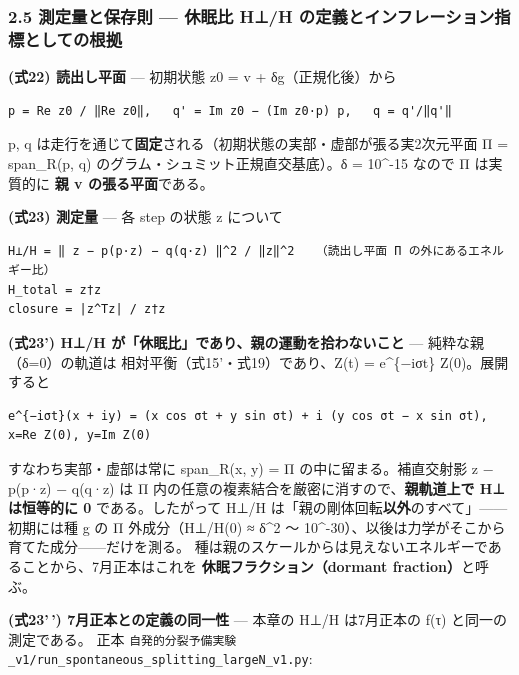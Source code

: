 \documentclass[
  a4paper,
]{ltjsarticle}
\begin{document}
\subsubsection{2.5 測定量と保存則 --- 休眠比 H⊥/H
の定義とインフレーション指標としての根拠}\label{ux6e2cux5b9aux91cfux3068ux4fddux5b58ux5247-ux4f11ux7720ux6bd4-hh-ux306eux5b9aux7fa9ux3068ux30a4ux30f3ux30d5ux30ecux30fcux30b7ux30e7ux30f3ux6307ux6a19ux3068ux3057ux3066ux306eux6839ux62e0}

\textbf{(式22) 読出し平面} --- 初期状態 z0 = v + δg（正規化後）から

\begin{verbatim}
p = Re z0 / ‖Re z0‖,   q' = Im z0 − (Im z0·p) p,   q = q'/‖q'‖
\end{verbatim}

p, q
は走行を通じて\textbf{固定}される（初期状態の実部・虚部が張る実2次元平面
Π = span\_R(p, q) のグラム・シュミット正規直交基底）。δ = 10\^{}-15
なので Π は実質的に \textbf{親 v の張る平面}である。

\textbf{(式23) 測定量} --- 各 step の状態 z について

\begin{verbatim}
H⊥/H = ‖ z − p(p·z) − q(q·z) ‖^2 / ‖z‖^2   （読出し平面 Π の外にあるエネルギー比）
H_total = z†z
closure = |z^Tz| / z†z
\end{verbatim}

\textbf{(式23') H⊥/H が「休眠比」であり、親の運動を拾わないこと} ---
純粋な親（δ=0）の軌道は 相対平衡（式15'・式19）であり、Z(t) =
e\^{}\{−iσt\} Z(0)。展開すると

\begin{verbatim}
e^{−iσt}(x + iy) = (x cos σt + y sin σt) + i (y cos σt − x sin σt),   x=Re Z(0), y=Im Z(0)
\end{verbatim}

すなわち実部・虚部は常に span\_R(x, y) = Π の中に留まる。補直交射影 z −
p(p·z) − q(q·z) は Π
内の任意の複素結合を厳密に消すので、\textbf{親軌道上で H⊥ は恒等的に 0}
である。したがって H⊥/H
は「親の剛体回転\textbf{以外}のすべて」------初期には種 g の Π
外成分（H⊥/H(0) ≈ δ\^{}2 〜
10\^{}-30）、以後は力学がそこから育てた成分------だけを測る。
種は親のスケールからは見えないエネルギーであることから、7月正本はこれを
\textbf{休眠フラクション（dormant fraction）}と呼ぶ。

\textbf{(式23'\,') 7月正本との定義の同一性} --- 本章の H⊥/H は7月正本の
f(τ) と同一の測定である。 正本
\texttt{自発的分裂予備実験\_v1/run\_spontaneous\_splitting\_largeN\_v1.py}:
\end{document}
